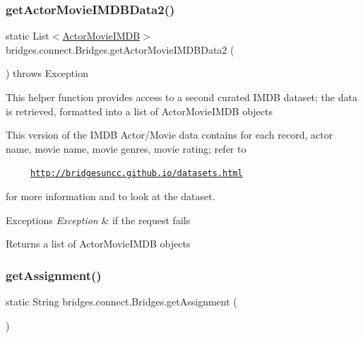 \mbox{\label{classbridges_1_1connect_1_1_bridges_a7a5f5efc6712ead5babe4cd21a4de3cc}} 
\subsubsection{\texorpdfstring{get\+Actor\+Movie\+I\+M\+D\+B\+Data2()}{getActorMovieIMDBData2()}}
{\footnotesize\ttfamily static List$<$\mbox{\hyperlink{classbridges_1_1data__src__dependent_1_1_actor_movie_i_m_d_b}{Actor\+Movie\+I\+M\+DB}}$>$ bridges.\+connect.\+Bridges.\+get\+Actor\+Movie\+I\+M\+D\+B\+Data2 (\begin{DoxyParamCaption}{ }\end{DoxyParamCaption}) throws Exception\hspace{0.3cm}{\ttfamily [static]}}

This helper function provides access to a second curated I\+M\+DB dataset; the data is retrieved, formatted into a list of Actor\+Movie\+I\+M\+DB objects

This version of the I\+M\+DB Actor/\+Movie data contains for each record, actor name, movie name, movie genres, movie rating; refer to 

~~~~~\href{http://bridgesuncc.github.io/datasets.html}{\tt http\+://bridgesuncc.\+github.\+io/datasets.\+html} 

for more information and to look at the dataset.


\begin{DoxyExceptions}{Exceptions}
{\em Exception} & if the request fails\\
\hline
\end{DoxyExceptions}
\begin{DoxyReturn}{Returns}
a list of Actor\+Movie\+I\+M\+DB objects 
\end{DoxyReturn}
\mbox{\label{classbridges_1_1connect_1_1_bridges_af049c06c532987eb616156fb16ea2f43}} 
\subsubsection{\texorpdfstring{get\+Assignment()}{getAssignment()}}
{\footnotesize\ttfamily static String bridges.\+connect.\+Bridges.\+get\+Assignment (\begin{DoxyParamCaption}{ }\end{DoxyParamCaption})\hspace{0.3cm}{\ttfamily [static]}}


